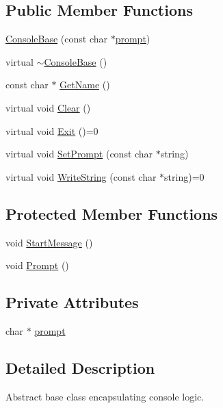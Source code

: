 \subsection*{Public Member Functions}
\begin{DoxyCompactItemize}
\item 
\hyperlink{classConsoleBase_a69210c6548727255c817e70cdd167f84}{Console\+Base} (const char $\ast$\hyperlink{classConsoleBase_ac0b5764a1c339ac271d0c44943e4370c}{prompt})
\item 
virtual \hyperlink{classConsoleBase_af249e9199923edc425c201c079d3c04a}{$\sim$\+Console\+Base} ()
\item 
const char $\ast$ \hyperlink{classConsoleBase_a787ac1707ea23d457c452ade014bec1f}{Get\+Name} ()
\item 
virtual void \hyperlink{classConsoleBase_a2f5aa6f61f903a098c315640e64815c6}{Clear} ()
\item 
virtual void \hyperlink{classConsoleBase_a2d23be5ddae9da94a486e05581ed1e35}{Exit} ()=0
\item 
virtual void \hyperlink{classConsoleBase_a9d0c878a925b9f17d67c5c7ba1c1cec3}{Set\+Prompt} (const char $\ast$string)
\item 
virtual void \hyperlink{classConsoleBase_a839801eeb5c25cd0a2cb13523e387bed}{Write\+String} (const char $\ast$string)=0
\end{DoxyCompactItemize}
\subsection*{Protected Member Functions}
\begin{DoxyCompactItemize}
\item 
void \hyperlink{classConsoleBase_a1a390339da026c37c036f87f3a084e87}{Start\+Message} ()
\item 
void \hyperlink{classConsoleBase_a79c5aa072ff3db35944a9825dcbfd9a7}{Prompt} ()
\end{DoxyCompactItemize}
\subsection*{Private Attributes}
\begin{DoxyCompactItemize}
\item 
char $\ast$ \hyperlink{classConsoleBase_ac0b5764a1c339ac271d0c44943e4370c}{prompt}
\end{DoxyCompactItemize}


\subsection{Detailed Description}
Abstract base class encapsulating console logic. 


